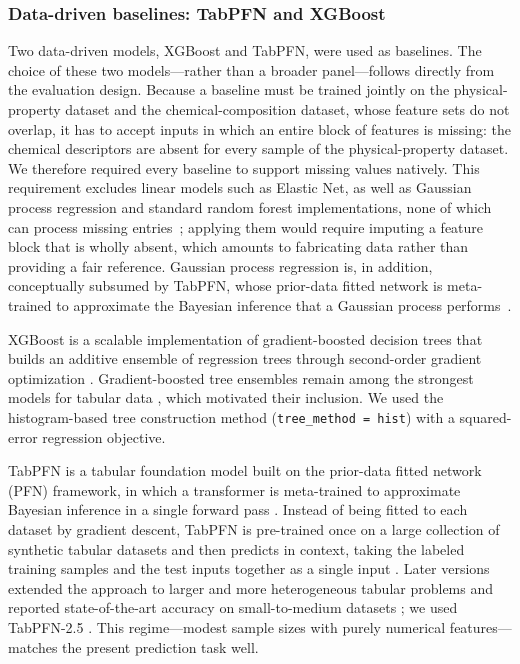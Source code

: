 \documentclass[11pt]{article}
\begin{document}
\subsubsection*{Data-driven baselines: TabPFN and XGBoost}

Two data-driven models, XGBoost and TabPFN, were used as baselines. The
choice of these two models---rather than a broader panel---follows directly
from the evaluation design. Because a baseline must be trained jointly on the
physical-property dataset and the chemical-composition dataset, whose feature
sets do not overlap, it has to accept inputs in which an entire block of
features is missing: the chemical descriptors are absent for every sample of
the physical-property dataset. We therefore required every baseline to support
missing values natively. This requirement excludes linear models such as
Elastic Net, as well as Gaussian process regression and standard random
forest implementations, none of which can process missing entries~\cite{sklearn_impute_docs, sklearn_release_1_4}; applying
them would require imputing a feature block that is wholly absent, which
amounts to fabricating data rather than providing a fair reference. Gaussian
process regression is, in addition, conceptually subsumed by TabPFN, whose
prior-data fitted network is meta-trained to approximate the Bayesian
inference that a Gaussian process performs~\cite{rasmussen2006gaussian, muller2022transformers}.

XGBoost is a scalable implementation of gradient-boosted decision trees that
builds an additive ensemble of regression trees through second-order gradient
optimization \cite{chen2016xgboost}. Gradient-boosted tree ensembles remain
among the strongest models for tabular data \cite{grinsztajn2022tree}, which
motivated their inclusion. We used the histogram-based tree construction
method (\texttt{tree\_method = hist}) with a squared-error regression
objective.

TabPFN is a tabular foundation model built on the prior-data fitted network
(PFN) framework, in which a transformer is meta-trained to approximate
Bayesian inference in a single forward pass \cite{muller2022transformers}.
Instead of being fitted to each dataset by gradient descent, TabPFN is
pre-trained once on a large collection of synthetic tabular datasets and then
predicts in context, taking the labeled training samples and the test inputs
together as a single input \cite{hollmann2022tabpfn}. Later versions extended
the approach to larger and more heterogeneous tabular problems and reported
state-of-the-art accuracy on small-to-medium datasets
\cite{hollmann2025tabpfn,grinsztajn2025tabpfn25}; we used TabPFN-2.5
\cite{grinsztajn2025tabpfn25}. This regime---modest sample sizes with purely
numerical features---matches the present prediction task well.
\end{document}
